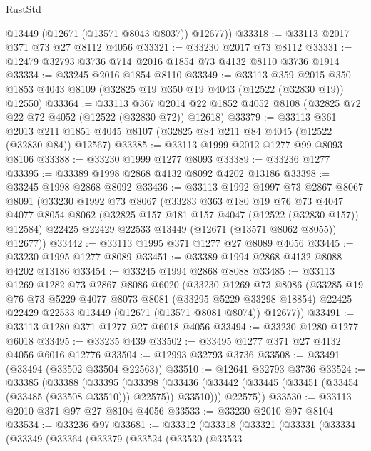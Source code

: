 \begin{lexlean}{RustStd}
\begin{coremodule}
        @13449
        (@12671 (@13571 @8043 @8037))
        @12677))
@33318 := @33113 @2017 @371 @73 @27 @8112 @4056
@33321 := @33230 @2017 @73 @8112
@33331 := @12479 @32793 @3736 @714 @2016 @1854 @73 @4132 @8110 @3736 @1914
@33334 := @33245 @2016 @1854 @8110
@33349 := @33113
    @359
    @2015
    @350
    @1853
    @4043
    @8109
    (@32825 @19 @350 @19 @4043 (@12522 (@32830 @19)) @12550)
@33364 := @33113
    @367
    @2014
    @22
    @1852
    @4052
    @8108
    (@32825 @72 @22 @72 @4052 (@12522 (@32830 @72)) @12618)
@33379 := @33113
    @361
    @2013
    @211
    @1851
    @4045
    @8107
    (@32825 @84 @211 @84 @4045 (@12522 (@32830 @84)) @12567)
@33385 := @33113 @1999 @2012 @1277 @99 @8093 @8106
@33388 := @33230 @1999 @1277 @8093
@33389 := @33236 @1277
@33395 := @33389 @1998 @2868 @4132 @8092 @4202 @13186
@33398 := @33245 @1998 @2868 @8092
@33436 := @33113
    @1992
    @1997
    @73
    @2867
    @8067
    @8091
    (@33230
      @1992
      @73
      @8067
      (@33283
        @363
        @180
        @19
        @76
        @73
        @4047
        @4077
        @8054
        @8062
        (@32825 @157 @181 @157 @4047 (@12522 (@32830 @157)) @12584)
        @22425
        @22429
        @22533
        @13449
        (@12671 (@13571 @8062 @8055))
        @12677))
@33442 := @33113 @1995 @371 @1277 @27 @8089 @4056
@33445 := @33230 @1995 @1277 @8089
@33451 := @33389 @1994 @2868 @4132 @8088 @4202 @13186
@33454 := @33245 @1994 @2868 @8088
@33485 := @33113
    @1269
    @1282
    @73
    @2867
    @8086
    @6020
    (@33230
      @1269
      @73
      @8086
      (@33285
        @19
        @76
        @73
        @5229
        @4077
        @8073
        @8081
        (@33295 @5229 @33298 @18854)
        @22425
        @22429
        @22533
        @13449
        (@12671 (@13571 @8081 @8074))
        @12677))
@33491 := @33113 @1280 @371 @1277 @27 @6018 @4056
@33494 := @33230 @1280 @1277 @6018
@33495 := @33235 @439
@33502 := @33495 @1277 @371 @27 @4132 @4056 @6016 @12776
@33504 := @12993 @32793 @3736
@33508 := @33491 (@33494 (@33502 @33504 @22563))
@33510 := @12641 @32793 @3736
@33524 := @33385
    (@33388
      (@33395
        (@33398 (@33436 (@33442 (@33445 (@33451 (@33454 (@33485 (@33508 @33510))) @22575)) @33510)))
        @22575))
@33530 := @33113 @2010 @371 @97 @27 @8104 @4056
@33533 := @33230 @2010 @97 @8104
@33534 := @33236 @97
@33681 := @33312
    (@33318
      (@33321
        (@33331
          (@33334
            (@33349
              (@33364
                (@33379
                  (@33524
                    (@33530
                      (@33533

\end{coremodule}
\end{lexlean}
